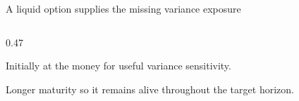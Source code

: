\begin{frame}{{\fontsize{15}{18}\selectfont A liquid option supplies the missing variance exposure}}
\begin{columns}[T,onlytextwidth]
\begin{column}{0.47\textwidth}
      \vspace{0.16cm}
      {\small\begin{tightitemize}
        \item Initially at the money for useful variance sensitivity.
        \item Longer maturity so it remains alive throughout the target horizon.
      \end{tightitemize}}
    \end{column}
  \end{columns}

\end{frame}

